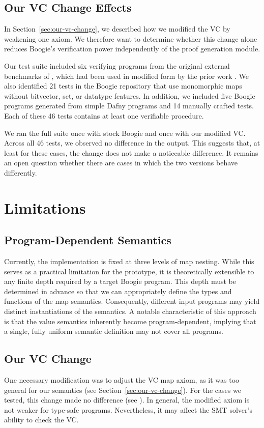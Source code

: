 \subsection{Our VC Change Effects}
\label{sec:vc-change-tests}
In Section~\ref{sec:our-vc-change}, we described how we modified the VC
by weakening one axiom.
We therefore want to determine whether this change alone reduces Boogie's verification power
independently of the proof generation module.

Our test suite included six verifying programs from the original external benchmarks of \cite{chen2017triggerless},
which had been used in modified form by the prior work \cite{parthasarathy2021formally}.
We also identified 21 tests in the Boogie repository that use monomorphic maps
without bitvector, set, or datatype features.
In addition, we included five Boogie programs generated from simple Dafny programs
and 14 manually crafted tests.
Each of these 46 tests contains at least one verifiable procedure.

We ran the full suite once with stock Boogie and once with our modified VC.
Across all 46 tests, we observed no difference in the output.
This suggests that, at least for these cases, the change does not make a noticeable difference.
It remains an open question whether there are cases in which the two versions behave differently.


\section{Limitations}
\label{sec:limitations}

\subsection{Program-Dependent Semantics}
Currently, the implementation is fixed at three levels of map nesting.
While this serves as a practical limitation for the prototype,
it is theoretically extensible to any finite depth required by a target Boogie program.
This depth must be determined in advance so that we can appropriately define the types and functions of the map semantics.
Consequently, different input programs may yield distinct instantiations of the semantics.
A notable characteristic of this approach is that the value semantics inherently become program-dependent,
implying that a single, fully uniform semantic definition may not cover all programs.


\subsection{Our VC Change}
One necessary modification was to adjust the VC map axiom,
as it was too general for our semantics (see Section~\ref{sec:our-vc-change}).
For the cases we tested, this change made no difference (see ).
In general, the modified axiom is not weaker for type-safe programs.
Nevertheless, it may affect the SMT solver's ability to check the VC.


